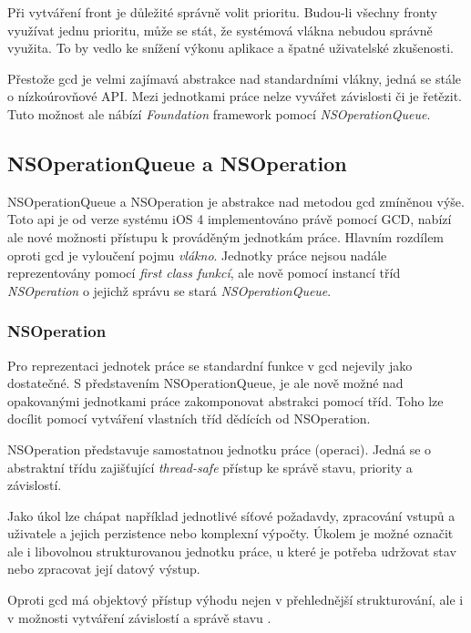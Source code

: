Při vytváření front je důležité správně volit prioritu.
Budou-li všechny fronty využívat jednu prioritu, může se stát, že systémová vlákna nebudou správně využita.
To by vedlo ke snížení výkonu aplikace a špatné uživatelské zkušenosti.

Přestože \acrshort{gcd} je velmi zajímavá abstrakce nad standardními vlákny, jedná se stále o nízkoúrovňové API.
Mezi jednotkami práce nelze vyvářet závislosti či je řetězit.
Tuto možnost ale nábízí \textit{Foundation} framework pomocí \textit{NSOperationQueue}.

\subsection{NSOperationQueue a NSOperation}

NSOperationQueue a NSOperation je abstrakce nad metodou \acrshort{gcd} zmíněnou výše.
Toto \acrshort{api} je od verze systému iOS 4 implementováno právě pomocí GCD, nabízí ale nové možnosti přístupu k prováděným jednotkám práce.
Hlavním rozdílem oproti \acrshort{gcd} je vyloučení pojmu \textit{vlákno}.
Jednotky práce nejsou nadále reprezentovány pomocí \textit{first class funkcí}, ale nově pomocí instancí tříd \textit{NSOperation} o jejichž správu se stará \textit{NSOperationQueue}. \cite{cocoacasts-nsoperation-vs-gcd}

\subsubsection*{NSOperation}

Pro reprezentaci jednotek práce se standardní funkce v \acrshort{gcd} nejevily jako dostatečné.
S představením NSOperationQueue, je ale nově možné nad opakovanými jednotkami práce zakomponovat abstrakci pomocí tříd.
Toho lze docílit pomocí vytváření vlastních tříd dědících od NSOperation.

NSOperation představuje samostatnou jednotku práce (operaci).
Jedná se o abstraktní třídu zajišťující \textit{thread-safe} přístup ke správě stavu, priority a závislostí.

Jako úkol lze chápat například jednotlivé síťové požadavdy, zpracování vstupů a uživatele a jejich perzistence nebo komplexní výpočty.
Úkolem je možné označit ale i libovolnou strukturovanou jednotku práce, u které je potřeba udržovat stav nebo zpracovat její datový výstup.

Oproti \acrshort{gcd} má objektový přístup výhodu nejen v přehlednější strukturování, ale i v možnosti vytváření závislostí a správě stavu \cite{apple-operation-queues}.

